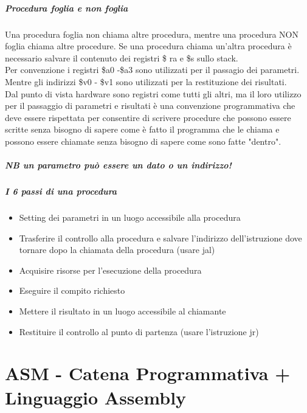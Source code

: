 \documentclass[12pt, a4paper, openany]{book}
\begin{document}
\paragraph{Procedura foglia e non foglia}
Una procedura foglia non chiama altre procedura, mentre una procedura NON foglia chiama altre
procedure.
Se una procedura chiama un'altra procedura è necessario salvare il contenuto dei registri \$ ra
e \$s sullo stack.
\\ Per convenzione i registri \$a0 -\$a3 sono utilizzati per il passagio dei parametri.
\\ Mentre gli indirizzi \$v0 - \$v1 sono utilizzati per la restituzione dei risultati.
\\ Dal punto di vista hardware sono registri come tutti gli altri, ma il loro utilizzo
per il passaggio di parametri e risultati è una convenzione programmativa che deve 
essere rispettata per consentire di scrivere procedure che possono essere scritte
senza bisogno di sapere come è fatto il programma che le chiama e possono essere chiamate
senza bisogno di sapere come sono fatte "dentro".
\paragraph*{NB un parametro può essere un dato o un indirizzo!}
\paragraph*{I 6 passi di una procedura}
\begin{itemize}
    \item Setting dei parametri in un luogo accessibile alla procedura
    \item Trasferire il controllo alla procedura e salvare l'indirizzo
    dell'istruzione dove tornare dopo la chiamata della procedura (usare jal)
    \item Acquisire risorse per l'esecuzione della procedura
    \item Eseguire il compito richiesto
    \item Mettere il risultato in un luogo accessibile al chiamante
    \item Restituire il controllo al punto di partenza (usare l'istruzione jr)
\end{itemize}


\chapter{ASM - Catena Programmativa + Linguaggio Assembly}
\end{document}
